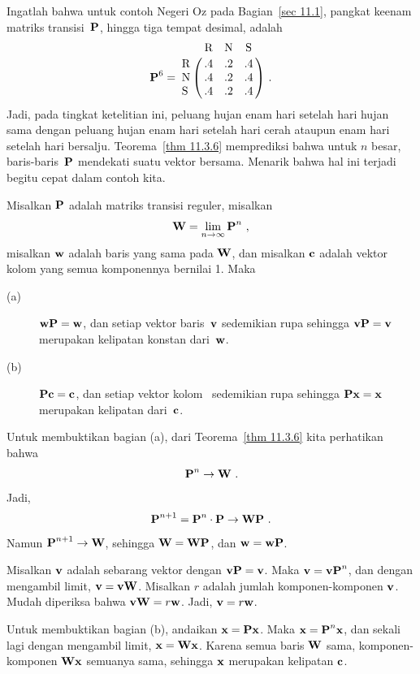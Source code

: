 \begin{example}\label{exam 11.3.1}
Ingatlah bahwa untuk contoh Negeri Oz pada Bagian~\ref{sec 11.1}, pangkat keenam
matriks transisi~${\mbox{\bf P}\/}$, hingga tiga tempat desimal, adalah
$$
\mat{P}^6 = \bordermatrix{
         & \mbox{R} & \mbox{N} & \mbox{S} \cr
\mbox{R} & .4 & .2 & .4 \cr
\mbox{N} & .4 & .2 & .4 \cr
\mbox{S}  & .4 & .2 & .4}\ .
$$
Jadi, pada tingkat ketelitian ini, peluang hujan enam hari setelah hari hujan
sama dengan peluang hujan enam hari setelah hari cerah ataupun enam hari setelah
hari bersalju. Teorema~\ref{thm 11.3.6} memprediksi bahwa untuk $n$ besar,
baris-baris~${\mbox{\bf P}\/}$ mendekati suatu vektor bersama. Menarik bahwa hal ini
terjadi begitu cepat dalam contoh kita.
\end{example}

\begin{theorem}\label{thm 11.3.8}
Misalkan ${\mbox{\bf P}\/}$ adalah matriks transisi reguler, misalkan
$${\mbox{\bf W}\/} = \lim_{n \rightarrow \infty} {\mbox{\bf P}\/}^n\ ,$$
misalkan ${\mbox{\bf w}\/}$ adalah baris yang sama pada ${\mbox{\bf W}\/}$, dan misalkan ${\mbox{\bf c}\/}$ adalah
vektor kolom yang semua komponennya bernilai 1. Maka
\begin{description}
\item[(a)]
${\mbox{\bf w}\/}{\mbox{\bf P}\/} = {\mbox{\bf w}\/}$, dan setiap vektor baris~${\mbox{\bf v}\/}$ sedemikian rupa
sehingga ${\mbox{\bf v}\/}{\mbox{\bf P}\/} = {\mbox{\bf v}\/}$ merupakan kelipatan konstan dari~${\mbox{\bf w}\/}$.
\item[(b)]
${\mbox{\bf P}\/}{\mbox{\bf c}\/} = {\mbox{\bf c}\/}$, dan setiap vektor kolom~ sedemikian rupa
sehingga ${\mbox{\bf P}\/}{\mbox{\bf x}\/} = {\mbox{\bf x}\/}$ merupakan kelipatan dari~${\mbox{\bf c}\/}$.
\end{description}
\proof
Untuk membuktikan bagian (a), dari Teorema~\ref{thm 11.3.6} kita perhatikan bahwa
$$
{\mbox{\bf P}\/}^n \to {\mbox{\bf W}\/}\ .
$$
Jadi,
$$
{\mbox{\bf P}\/}^{n + 1} = {\mbox{\bf P}\/}^n \cdot {\mbox{\bf P}\/} \to {\mbox{\bf W}\/}{\mbox{\bf P}\/}\ .
$$
Namun ${\mbox{\bf P}\/}^{n + 1} \to {\mbox{\bf W}\/}$, sehingga ${\mbox{\bf W}\/} = {\mbox{\bf W}\/}{\mbox{\bf P}\/}$, dan
${\mbox{\bf w}\/} =
{\mbox{\bf w}\/}{\mbox{\bf P}\/}$. 
\par
Misalkan ${\mbox{\bf v}\/}$ adalah sebarang vektor 
dengan ${\mbox{\bf v}\/} {\mbox{\bf P}\/} = {\mbox{\bf v}\/}$. Maka ${\mbox{\bf v}\/} = {\mbox{\bf v}\/} {\mbox{\bf P}\/}^n$, dan
dengan mengambil limit,
${\mbox{\bf v}\/} = {\mbox{\bf v}\/} {\mbox{\bf W}\/}$. Misalkan $r$ adalah jumlah komponen-komponen
${\mbox{\bf v}\/}$.
Mudah diperiksa bahwa ${\mbox{\bf v}\/}{\mbox{\bf W}\/} = r{\mbox{\bf w}\/}$. Jadi, ${\mbox{\bf v}\/} =
r{\mbox{\bf w}\/}$.
\par
Untuk membuktikan bagian (b), andaikan ${\mbox{\bf x}\/} = {\mbox{\bf P}\/} {\mbox{\bf x}\/}$. Maka ${\mbox{\bf x}\/} =
{\mbox{\bf P}\/}^n
{\mbox{\bf x}\/}$, dan sekali lagi dengan mengambil limit, ${\mbox{\bf x}\/} =  {\mbox{\bf W}\/}{\mbox{\bf x}\/}$.
Karena semua baris
${\mbox{\bf W}\/}$ sama, komponen-komponen ${\mbox{\bf W}\/}{\mbox{\bf x}\/}$ semuanya sama, sehingga
${\mbox{\bf x}\/}$ merupakan
kelipatan ${\mbox{\bf c}\/}$.
\end{theorem}

